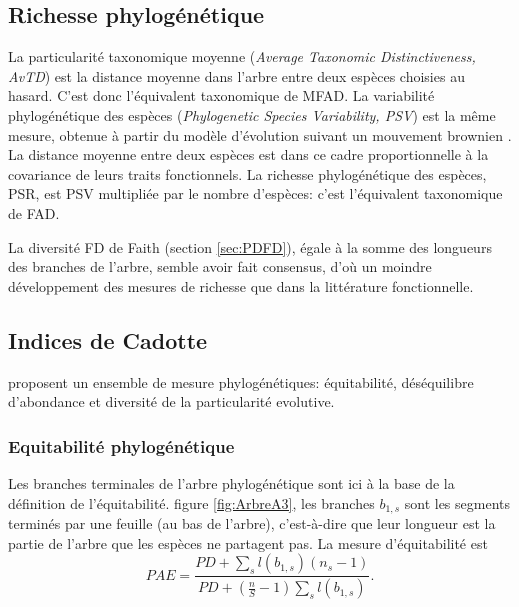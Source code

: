 \documentclass[
  11pt,
  french,
  a4paper,
  extrafontsizes,onecolumn,openright
  ]{memoir}
\begin{document}
\normalsize

\hypertarget{richesse-phyloguxe9nuxe9tique}{%
\subsection{Richesse phylogénétique}\label{richesse-phyloguxe9nuxe9tique}}

La particularité taxonomique moyenne \autocite{Warwick1995} (\emph{Average Taxonomic Distinctiveness, AvTD}) est la distance moyenne dans l'arbre entre deux espèces choisies au hasard.
C'est donc l'équivalent taxonomique de MFAD.
La variabilité phylogénétique des espèces \autocite{Helmus2007} (\emph{Phylogenetic Species Variability, PSV}) est la même mesure, obtenue à partir du modèle d'évolution suivant un mouvement brownien \autocite{Felsenstein1985}.
La distance moyenne entre deux espèces est dans ce cadre proportionnelle à la covariance de leurs traits fonctionnels.
La richesse phylogénétique des espèces, PSR, est PSV multipliée par le nombre d'espèces: c'est l'équivalent taxonomique de FAD.

La diversité FD de Faith (section \ref{sec:PDFD}), égale à la somme des longueurs des branches de l'arbre, semble avoir fait consensus, d'où un moindre développement des mesures de richesse que dans la littérature fonctionnelle.

\hypertarget{indices-de-cadotte}{%
\subsection{Indices de Cadotte}\label{indices-de-cadotte}}

\textcite{Cadotte2010} proposent un ensemble de mesure phylogénétiques: équitabilité, déséquilibre d'abondance et diversité de la particularité evolutive.

\hypertarget{equitabilituxe9-phyloguxe9nuxe9tique}{%
\subsubsection{Equitabilité phylogénétique}\label{equitabilituxe9-phyloguxe9nuxe9tique}}

Les branches terminales de l'arbre phylogénétique sont ici à la base de la définition de l'équitabilité.
figure \ref{fig:ArbreA3}, les branches \(b_{1,s}\) sont les segments terminés par une feuille (au bas de l'arbre), c'est-à-dire que leur longueur est la partie de l'arbre que les espèces ne partagent pas.
La mesure d'équitabilité est
\begin{equation}
  \mathit{PAE} = \frac{\mathit{PD} + \sum_s{l(b_{1,s})(n_s-1)}}{\mathit{PD} + (\frac{n}{S}-1)\sum_s{l(b_{1,s})} }.
\end{equation}
\end{document}
